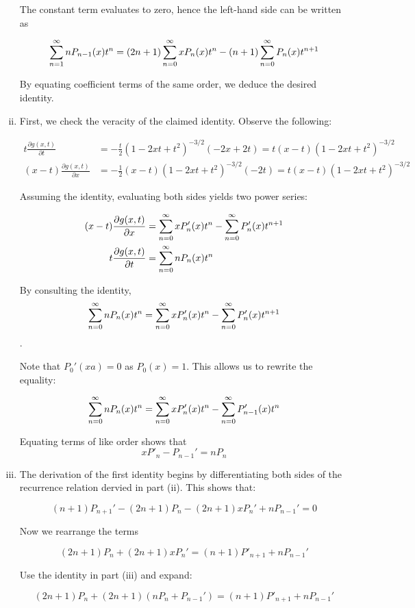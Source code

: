 \documentclass[12pt]{article}%
\newcommand{\gpart}[1][t]{\frac{\partial g(x,t)}{\partial {#1}}}
\begin{document}
\begin{enumerate}[i.]
  The constant term evaluates to zero, hence the left-hand side can be written as

  \[ \powaseries[1] n P_{n-1}(x)t^{n} = (2n+1) \powaseries xP_n(x)t^n - (n+1) \powaseries P_n(x)t^{n+1}\]

  By equating coefficient terms of the same order, we deduce the desired identity.

  \item

  First, we check the veracity of the claimed identity. Observe the following:

  \begin{align*}
      t \gpart & = -\frac{t}{2}(1 - 2xt + t^2)^{-3/2}(-2x + 2t) = t(x-t)(1 - 2xt + t^2)^{-3/2} \\
      (x-t) \gpart[x] & = -\frac{1}{2}(x-t)(1 - 2xt + t^2)^{-3/2}(-2t) = t(x-t)(1 - 2xt + t^2)^{-3/2}
  \end{align*}


  Assuming the identity, evaluating both sides yields two power series:


  \begin{align*}
      (x-t) \gpart[x] & = \powaseries x P_n'(x) t^n - \powaseries P_n'(x)t^{n+1} \\
      t \gpart  & = \powaseries nP_n(x)t^n
  \end{align*}

  By consulting the identity,
  \[ \powaseries nP_n(x)t^n =  \powaseries x P_n'(x) t^n - \powaseries P_n'(x)t^{n+1}\].

  Note that $P_0'(xa) = 0$ as $P_0(x) = 1$. This allows us to rewrite the equality:

  \[ \powaseries nP_n(x)t^n =  \powaseries x P_n'(x) t^n - \powaseries P_{n-1}'(x)t^{n}\]

  Equating terms of like order shows that
  \[ xP'_n - P_{n-1}' = nP_n \]

  \item
  The derivation of the first identity begins by differentiating both sides of the recurrence relation dervied in part (ii). This shows that:

  \[(n+1)P_{n+1}' - (2n+1)P_n - (2n+1)xP_n' + nP_{n-1}' = 0 \]

  Now we rearrange the terms

  \[ (2n + 1)P_n + (2n +1)xP_n' = (n+1)P'_{n+1} + nP_{n-1}' \]

  Use the identity in part (iii) and expand:



  \[ (2n + 1)P_n + (2n +1)(nP_n + P_{n-1}') = (n+1)P'_{n+1} + nP_{n-1}' \]


\end{enumerate}
\end{document}
